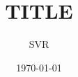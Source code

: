 \documentclass[12pt]{extarticle}
\title{TITLE}
\author{SVR}
\date{\today}
\begin{document}
\maketitle



\lipsum







\newpage
\begin{paracol}{2}
    \lipsum
    \switchcolumn
    \lipsum
\end{paracol}




\end{document}
